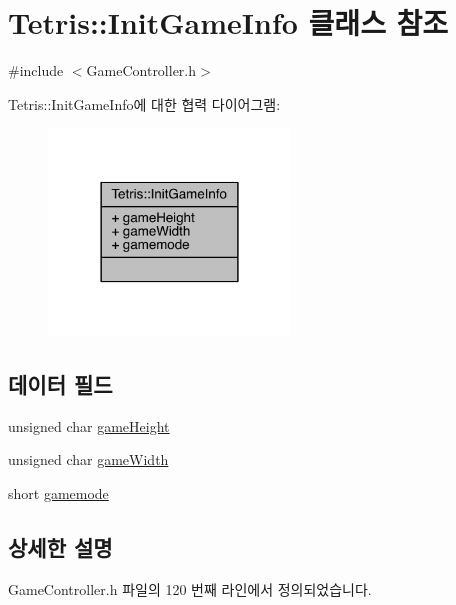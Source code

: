 \hypertarget{class_tetris_1_1_init_game_info}{}\section{Tetris\+:\+:Init\+Game\+Info 클래스 참조}
\label{class_tetris_1_1_init_game_info}


{\ttfamily \#include $<$Game\+Controller.\+h$>$}



Tetris\+:\+:Init\+Game\+Info에 대한 협력 다이어그램\+:
\nopagebreak
\begin{figure}[H]
\begin{center}
\leavevmode
\includegraphics[width=182pt]{d9/d64/class_tetris_1_1_init_game_info__coll__graph}
\end{center}
\end{figure}
\subsection*{데이터 필드}
\begin{DoxyCompactItemize}
\item 
unsigned char \hyperlink{class_tetris_1_1_init_game_info_a4b0520a703e20bf84077c2d9706a0ef2}{game\+Height}
\item 
unsigned char \hyperlink{class_tetris_1_1_init_game_info_a035e9d0d8d8b92436b2683627ca51059}{game\+Width}
\item 
short \hyperlink{class_tetris_1_1_init_game_info_a5d4655981462fd53da508dfba0d2e99c}{gamemode}
\end{DoxyCompactItemize}


\subsection{상세한 설명}


Game\+Controller.\+h 파일의 120 번째 라인에서 정의되었습니다.



